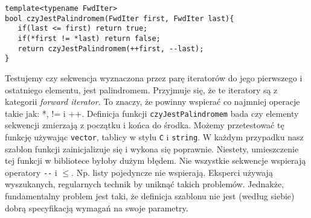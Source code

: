 \documentclass[11pt, a4paper]{article}
\begin{document}
\begin{lstlisting}[frame=single]
template<typename FwdIter>
bool czyJestPalindromem(FwdIter first, FwdIter last){
   if(last <= first) return true;
   if(*first != *last) return false;
   return czyJestPalindromem(++first, --last);
}

\end{lstlisting}

Testujemy czy sekwencja wyznaczona przez parę iteratorów do jego pierwszego i ostatniego elementu, jest palindromem. Przyjmuje się, że te iteratory są z kategorii \emph{forward iterator}. To znaczy, że powinny wspierać co najmniej operacje takie jak: *, != i ++. Definicja funkcji \verb#czyJestPalindromem# bada czy elementy sekwencji zmierzają z początku i końca do środka. Możemy przetestować tę funkcję używając \verb#vector#, tablicy w stylu \verb#C# i \verb#string#. W każdym przypadku nasz szablon funkcji zainicjalizuje się i wykona się poprawnie. Niestety, umieszczenie tej funkcji w bibliotece byłoby dużym błędem. Nie wszystkie sekwencje wspierają operatory \verb#--# i $\leq$. Np. listy pojedyncze nie wspierają. Eksperci używają wyszukanych, regularnych technik by uniknąć takich problemów.  Jednakże, fundamentalny problem jest taki, że definicja szablonu nie jest (według siebie) dobrą specyfikacją wymagań na swoje parametry.
\end{document}
